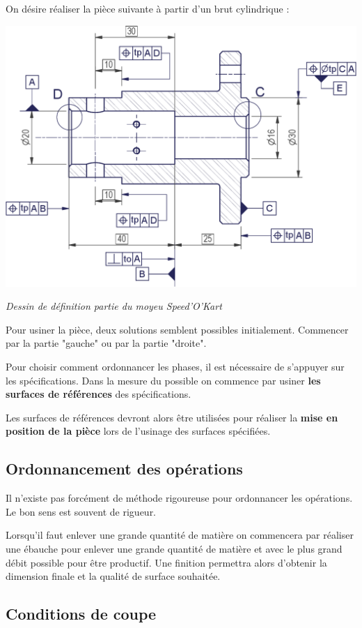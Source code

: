 \documentclass[11pt,oneside]{article}
\begin{document}
On désire réaliser la pièce suivante à partir d'un brut cylindrique :
\begin{center}
\includegraphics[width=.7\textwidth]{png/moyeu}

\textit{Dessin de définition partie du moyeu Speed'O'Kart}
\end{center}

Pour usiner la pièce, deux solutions semblent possibles initialement. Commencer par la partie "gauche" ou par la partie "droite". 
 
\begin{methode}
Pour choisir comment ordonnancer les phases, il est nécessaire de s'appuyer sur les spécifications.  Dans la mesure du possible on commence par usiner \textbf{les surfaces de références} des spécifications.

Les surfaces de références devront alors être utilisées pour réaliser la \textbf{mise en position de la pièce} lors de l'usinage des surfaces spécifiées.
\end{methode}


\subsection{Ordonnancement des opérations}
Il n'existe pas forcément de méthode rigoureuse pour ordonnancer les opérations. Le bon sens est souvent de rigueur. 

Lorsqu'il faut enlever une grande quantité de matière on commencera par réaliser une ébauche pour enlever une grande quantité de matière et avec le plus grand débit possible pour être productif. Une finition permettra alors d'obtenir la dimension finale et la qualité de surface souhaitée.

\subsection{Conditions de coupe}
\end{document}
